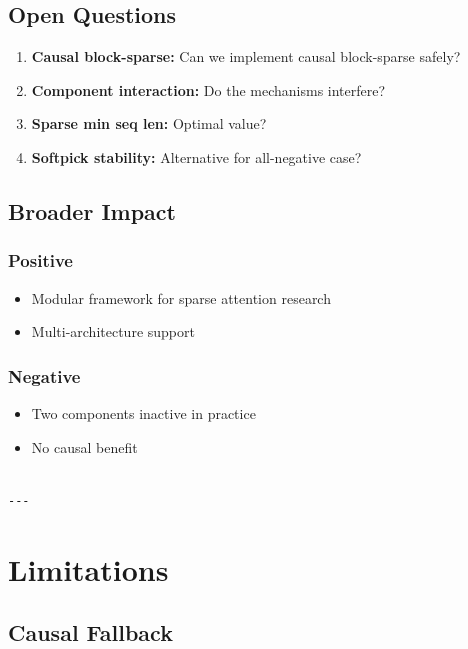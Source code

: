 \subsection{Open Questions}

\begin{enumerate}
\item \textbf{Causal block-sparse:} Can we implement causal block-sparse safely?
\item \textbf{Component interaction:} Do the mechanisms interfere?
\item \textbf{Sparse min seq len:} Optimal value?
\item \textbf{Softpick stability:} Alternative for all-negative case?

\end{enumerate}
\subsection{Broader Impact}

\subsubsection{Positive}
\begin{itemize}
\item Modular framework for sparse attention research
\item Multi-architecture support

\end{itemize}
\subsubsection{Negative}
\begin{itemize}
\item Two components inactive in practice
\item No causal benefit
\end{itemize}
\begin{lstlisting}

---
\end{lstlisting}

\section{Limitations}

\subsection{Causal Fallback}

